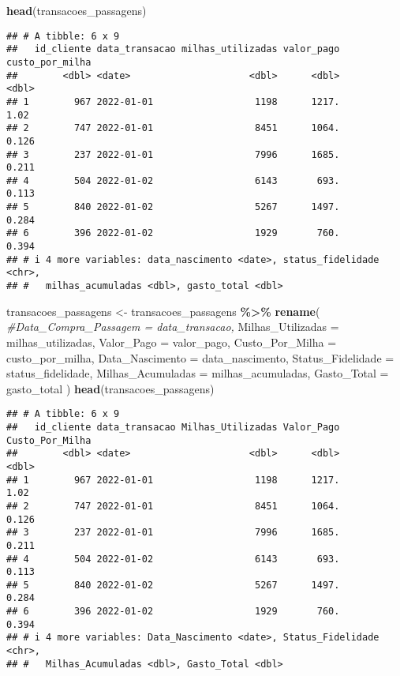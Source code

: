 \documentclass[
]{article}
\newenvironment{Shaded}{\begin{snugshade}}{\end{snugshade}}
\newcommand{\AttributeTok}[1]{\textcolor[rgb]{0.13,0.29,0.53}{#1}}
\newcommand{\CommentTok}[1]{\textcolor[rgb]{0.56,0.35,0.01}{\textit{#1}}}
\newcommand{\FunctionTok}[1]{\textcolor[rgb]{0.13,0.29,0.53}{\textbf{#1}}}
\newcommand{\NormalTok}[1]{#1}
\newcommand{\OtherTok}[1]{\textcolor[rgb]{0.56,0.35,0.01}{#1}}
\newcommand{\SpecialCharTok}[1]{\textcolor[rgb]{0.81,0.36,0.00}{\textbf{#1}}}
\begin{document}
\begin{Shaded}
\begin{Highlighting}[]
\FunctionTok{head}\NormalTok{(transacoes\_passagens)}
\end{Highlighting}
\end{Shaded}

\begin{verbatim}
## # A tibble: 6 x 9
##   id_cliente data_transacao milhas_utilizadas valor_pago custo_por_milha
##        <dbl> <date>                     <dbl>      <dbl>           <dbl>
## 1        967 2022-01-01                  1198      1217.           1.02 
## 2        747 2022-01-01                  8451      1064.           0.126
## 3        237 2022-01-01                  7996      1685.           0.211
## 4        504 2022-01-02                  6143       693.           0.113
## 5        840 2022-01-02                  5267      1497.           0.284
## 6        396 2022-01-02                  1929       760.           0.394
## # i 4 more variables: data_nascimento <date>, status_fidelidade <chr>,
## #   milhas_acumuladas <dbl>, gasto_total <dbl>
\end{verbatim}

\begin{Shaded}
\begin{Highlighting}[]
\NormalTok{transacoes\_passagens }\OtherTok{\textless{}{-}}\NormalTok{ transacoes\_passagens }\SpecialCharTok{\%\textgreater{}\%} \FunctionTok{rename}\NormalTok{(}
  \CommentTok{\#Data\_Compra\_Passagem = data\_transacao,}
  \AttributeTok{Milhas\_Utilizadas =}\NormalTok{ milhas\_utilizadas,}
  \AttributeTok{Valor\_Pago =}\NormalTok{ valor\_pago,}
  \AttributeTok{Custo\_Por\_Milha =}\NormalTok{ custo\_por\_milha,}
  \AttributeTok{Data\_Nascimento =}\NormalTok{ data\_nascimento,}
  \AttributeTok{Status\_Fidelidade =}\NormalTok{ status\_fidelidade,}
  \AttributeTok{Milhas\_Acumuladas =}\NormalTok{ milhas\_acumuladas,}
  \AttributeTok{Gasto\_Total =}\NormalTok{ gasto\_total}
\NormalTok{) }
\FunctionTok{head}\NormalTok{(transacoes\_passagens)}
\end{Highlighting}
\end{Shaded}

\begin{verbatim}
## # A tibble: 6 x 9
##   id_cliente data_transacao Milhas_Utilizadas Valor_Pago Custo_Por_Milha
##        <dbl> <date>                     <dbl>      <dbl>           <dbl>
## 1        967 2022-01-01                  1198      1217.           1.02 
## 2        747 2022-01-01                  8451      1064.           0.126
## 3        237 2022-01-01                  7996      1685.           0.211
## 4        504 2022-01-02                  6143       693.           0.113
## 5        840 2022-01-02                  5267      1497.           0.284
## 6        396 2022-01-02                  1929       760.           0.394
## # i 4 more variables: Data_Nascimento <date>, Status_Fidelidade <chr>,
## #   Milhas_Acumuladas <dbl>, Gasto_Total <dbl>
\end{verbatim}
\end{document}
